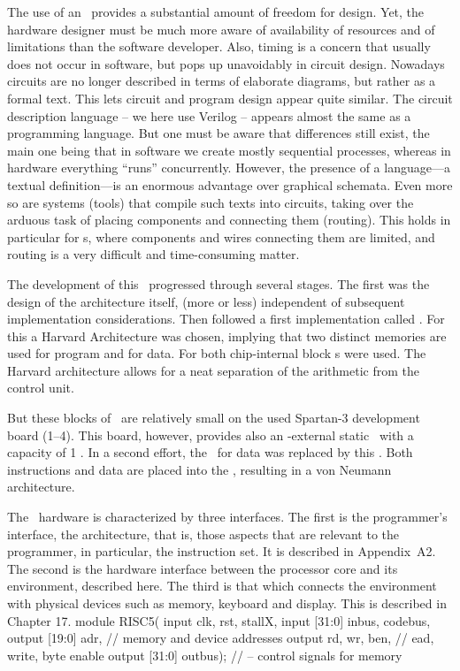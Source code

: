 The use of an \FPGA\ provides a substantial amount of freedom for design. Yet, the hardware designer must be much more aware of availability of resources and of limitations than the software developer. Also, timing is a concern that usually does not occur in software, but pops up unavoidably in circuit design. Nowadays circuits are no longer described in terms of elaborate diagrams, but rather as a formal text. This lets circuit and program design appear quite similar. The circuit description language – we here use Verilog – appears almost the same as a programming language. But one must be aware that differences still exist, the main one being that in software we create mostly sequential processes, whereas in hardware everything ``runs'' concurrently. However, the presence of a language---a textual definition---is an enormous advantage over graphical schemata. Even more so are systems (tools) that compile such texts into circuits, taking over the arduous task of placing components and connecting them (routing). This holds in particular for \FPGA{}s, where components and wires connecting them are limited, and routing is a very difficult and time-consuming matter.

The development of this \RISC\ progressed through several stages. The first was the design of the architecture itself, (more or less) independent of subsequent implementation considerations. Then followed a first implementation called . For this a Harvard Architecture was chosen, implying that two distinct memories are used for program and for data. For both chip-internal block \RAM{}s were used. The Harvard architecture allows for a neat separation of the arithmetic from the control unit.

But these blocks of \RAM\ are relatively small on the used Spartan-3 development board (1--4\Kwords). This board, however, provides also an \FPGA-external static \RAM\ with a capacity of 1 \MB. In a second effort, the \BRAM\ for data was replaced by this \SRAM. Both instructions and data are placed into the \SRAM, resulting in a von Neumann architecture.

The \RISC\ hardware is characterized by three interfaces. The first is the programmer's interface, the architecture, that is, those aspects that are relevant to the programmer, in particular, the instruction set. It is described in Appendix~A2. The second is the hardware interface between the processor core and its environment, described here. The third is that which connects the environment with physical devices such as memory, keyboard and display. This is described in Chapter 17.
\begintt
module RISC5(
  input clk, rst, stallX,
  input [31:0] inbus, codebus,
  output [19:0] adr,     // memory and device addresses
  output rd, wr, ben,    // ead, write, byte enable
  output [31:0] outbus); //   -- control signals for memory
\endtt

